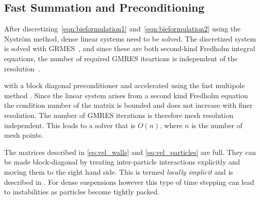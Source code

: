 \documentclass[preprint, 10pt]{elsarticle}
\begin{document}
\subsection{Fast Summation and Preconditioning}
After discretizing~\eqref{eqn:bieformulation1}
and~\eqref{eqn:bieformulation2} using the Nystr\"om method, dense linear
systems need to be solved.  The discretized system is solved with
GRMES~\cite{Saad1986}, and since these are both second-kind Fredholm
integral equations, the number of required GMRES iteartions is
independent of the resolution~\cite{cam-ips-kel-mey-xue1996}.

with a block diagonal preconditioner and
accelerated using the fast multipole method \cite{Greengard1987}.  Since
the linear system arises from a second kind Fredholm equation the
condition number of the matrix is bounded and does not increase with
finer resolution. The number of GMRES iterations is therefore mesh
resolution independent. This leads to a solver that is $O(n)$, where $n$
is the number of mesh points. 

The matrices described in \eqref{eq:vel_walls} and
\eqref{eq:vel_particles} are full. They can be made block-diagonal by
treating inter-particle interactions explicitly and moving them to the
right hand side. This is termed {\em locally implicit} and is described
in \cite{Lu2017}. For dense suspensions however this type of time
stepping can lead to instabilities as particles become tightly packed. 

\end{document}
